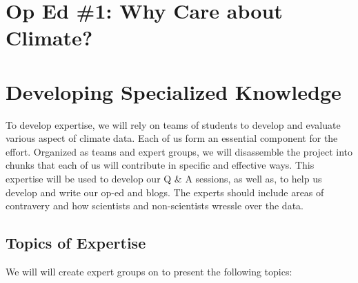 \documentclass{article}\usepackage[]{graphicx}\usepackage[]{color}
\begin{document}
\section{Op Ed \#1: Why Care about Climate?}



\section{Developing Specialized Knowledge}

To develop expertise, we will rely on teams of students to develop and evaluate various aspect of climate data. Each of us form an essential component for the effort. Organized as teams and expert groups, we will disassemble the project into chunks that each of us will contribute in specific and effective ways. This expertise will be used to develop our Q \& A sessions, as well as, to help us develop and write our op-ed and blogs. The experts should include areas of contravery and how scientists and non-scientists wressle over the data.

\subsection{Topics of Expertise}

We will will create expert groups on to present the following topics:
\end{document}
